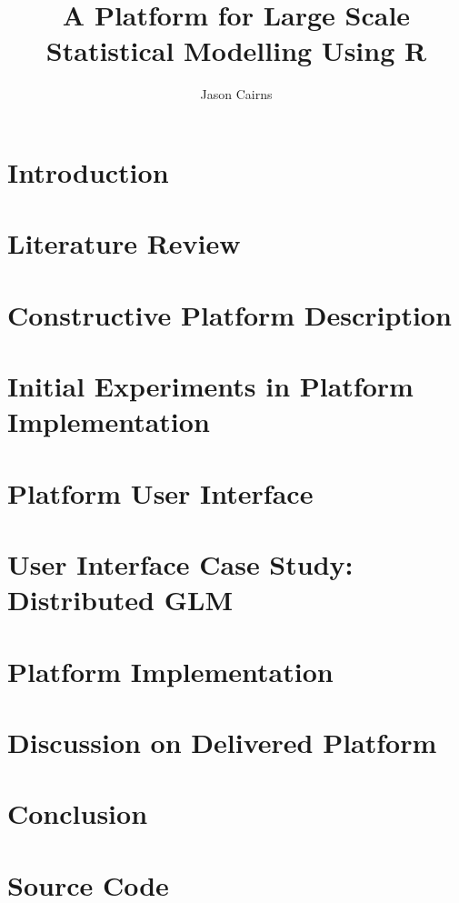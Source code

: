 \documentclass[11pt,a4paper,partial,examcopy]{aucklandthesis} %
\title{A Platform for Large Scale Statistical Modelling Using R}
\author{Jason Cairns}
\begin{document}


\chapter{Introduction}


\chapter{Literature Review}


\chapter{Constructive Platform Description}


\chapter{Initial Experiments in Platform Implementation}


\chapter{Platform User Interface}


\chapter{User Interface Case Study: Distributed GLM}


\chapter{Platform Implementation}
\chapter{Discussion on Delivered Platform}
\chapter{Conclusion}

\appendix
\chapter{Source Code}

\printbibliography
\end{document}
